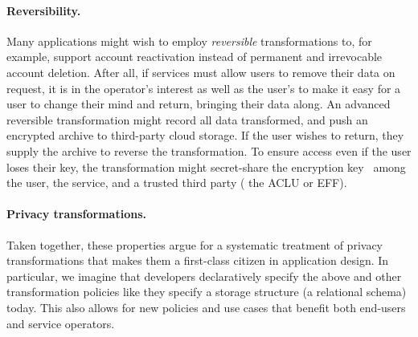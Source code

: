 \paragraph{Reversibility.}
%
Many applications might wish to employ \emph{reversible} transformations to, for example, support
account reactivation instead of permanent and irrevocable account deletion.
%
After all, if services must allow users to remove their data on request, it is in the operator's
interest as well as the user's to make it easy for a user to change their mind and return, bringing their data along.
%
An advanced reversible transformation might record all data transformed, and push an encrypted
archive to third-party cloud storage.
%
If the user wishes to return, they supply the archive to reverse the transformation.
%
To ensure access even if the user loses their key, the transformation might secret-share
the encryption key~\cite{secretsharing} among the user, the service, and a trusted third party (\eg
the ACLU or EFF).
%

\paragraph{Privacy transformations.}
%
Taken together, these properties argue for a systematic treatment of privacy transformations that makes them a
first-class citizen in application design.
%
In particular, we imagine that developers declaratively specify the above and other
transformation policies like they specify a storage structure (\eg a relational schema) today.
%
This also allows for new policies and use cases that benefit both end-users and service operators.
%
%
